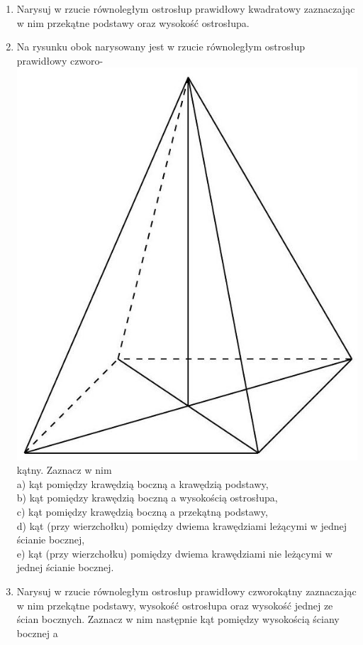 \documentclass[10pt]{article}
\begin{document}
\begin{enumerate}
  \item Narysuj w rzucie równoległym ostrosłup prawidłowy kwadratowy zaznaczając w nim przekątne podstawy oraz wysokość ostrosłupa.
  \item Na rysunku obok narysowany jest w rzucie równoległym ostrosłup prawidłowy czworo-\\
\includegraphics[max width=\textwidth, center]{2024_11_21_e9b4faa005d5be2cc318g-085}\\
kątny. Zaznacz w nim\\
a) kąt pomiędzy krawędzią boczną a krawędzią podstawy,\\
b) kąt pomiędzy krawędzią boczną a wysokością ostrosłupa,\\
c) kąt pomiędzy krawędzią boczną a przekątną podstawy,\\
d) kąt (przy wierzchołku) pomiędzy dwiema krawędziami leżącymi w jednej ścianie bocznej,\\
e) kąt (przy wierzchołku) pomiędzy dwiema krawędziami nie leżącymi w jednej ścianie bocznej.
  \item Narysuj w rzucie równoległym ostrosłup prawidłowy czworokątny zaznaczając w nim przekątne podstawy, wysokość ostrosłupa oraz wysokość jednej ze ścian bocznych. Zaznacz w nim następnie kąt pomiędzy wysokością ściany bocznej a\\

\end{enumerate}
\end{document}
